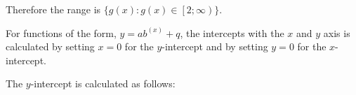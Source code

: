           
          \label{m39348*id251329}Therefore the range is \begin{math}\{g\left(x\right):g\left(x\right)\in \left[2;\infty \right)\}\end{math}.\par 
        
        \label{m39348*uid188}
            \nopagebreak
            
          
          \label{m39348*id251389}For functions of the form, \begin{math}y=a{b}^{\left(x\right)}+q\end{math}, the intercepts with the \begin{math}x\end{math} and \begin{math}y\end{math} axis is calculated by setting \begin{math}x=0\end{math} for the \begin{math}y\end{math}-intercept and by setting \begin{math}y=0\end{math} for the \begin{math}x\end{math}-intercept.\par 
          \label{m39348*id251491}The \begin{math}y\end{math}-intercept is calculated as follows:\par 
          \label{m39348*uid189}\nopagebreak\noindent{}
